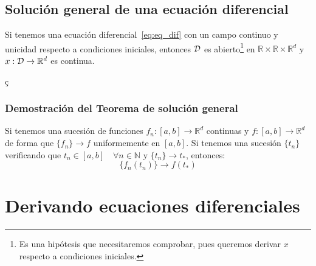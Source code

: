 \documentclass[12pt]{book}
\begin{document}
\section{Solución general de una ecuación diferencial}

\begin{teo}\label{teo:sol_general}
    Si tenemos una ecuación diferencial~\eqref{eq:eq_dif} con un campo continuo y unicidad respecto a condiciones iniciales, entonces $\mathcal{D}$ es abierto\footnote{Es una hipótesis que necesitaremos comprobar, pues queremos derivar $x$ respecto a condiciones iniciales.} en $\mathbb{R}\times\mathbb{R}\times\mathbb{R}^d$ y $x:\mathcal{D}\to \mathbb{R}^d$ es continua.
\end{teo}
ç

\subsection{Demostración del Teorema de solución general}

\begin{lema}[Caratheodory]\label{lema:caratheodory}
    Si tenemos una sucesión de funciones $f_n:[a,b]\to \mathbb{R}^d$ continuas y $f:[a,b]\to \mathbb{R}^d$ de forma que $\{f_n\}\to f$ uniformemente en $[a,b]$. Si tenemos una sucesión $\{t_n\}$ verificando que $t_n \in [a,b]\quad \forall n\in \mathbb{N}$ y $\{t_n\}\to t_\ast$, entonces:
    \begin{equation*}
        \{f_n(t_n)\} \to f(t_\ast)
    \end{equation*}
\end{lema}

\chapter{Derivando ecuaciones diferenciales}
\end{document}

